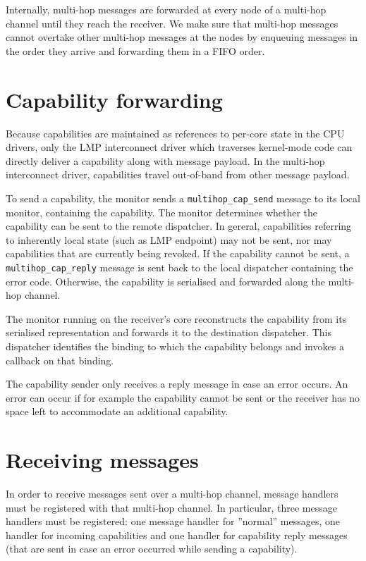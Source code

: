 \documentclass[a4paper,twoside]{report} %
\begin{document}
Internally, multi-hop messages are forwarded at every node of a multi-hop channel until they reach the receiver. We make sure that multi-hop messages cannot overtake other multi-hop messages at the nodes by enqueuing messages in the order they arrive and forwarding them in a FIFO order.

\section{Capability forwarding}
\label{section: capabilities}
Because capabilities are maintained as references to per-core state in the CPU drivers, only the LMP interconnect driver which traverses kernel-mode code can directly deliver a capability along with message payload. In the multi-hop interconnect driver, capabilities travel out-of-band from other message payload. 

To send a capability, the monitor sends a \texttt{multihop\_cap\_send} message to its local monitor, containing the capability. The monitor determines whether the capability can be sent to the remote dispatcher. In gereral, capabilities referring to inherently local state (such as LMP endpoint) may not be sent, nor may capabilities that are currently being revoked. If the capability cannot be sent, a \texttt{multihop\_cap\_reply} message is sent back to the local dispatcher containing the error code. Otherwise, the capability is serialised and forwarded along the multi-hop channel. 

The monitor running on the receiver's core reconstructs the capability from its serialised representation and forwards it to the destination dispatcher. This dispatcher identifies the binding to which the capability belongs and invokes a callback on that binding. 

The capability sender only receives a reply message in case an error occurs. An error can occur if for example the capability cannot be sent or the receiver has no space left to accommodate an additional capability.

\section{Receiving messages}
In order to receive messages sent over a multi-hop channel, message handlers must be registered with that multi-hop channel. In particular, three message handlers must be registered: one message handler for ''normal'' messages, one handler for incoming capabilities and one handler for capability reply messages (that are sent in case an error occurred while sending a capability).
\end{document}
